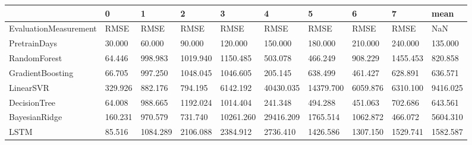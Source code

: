 \begin{tabular}{llllllllll}
\toprule
{} &       0 &        1 &        2 &         3 &         4 &         5 &        6 &        7 &     mean \\
\midrule
EvaluationMeasurement &    RMSE &     RMSE &     RMSE &      RMSE &      RMSE &      RMSE &     RMSE &     RMSE &      NaN \\
PretrainDays          &  30.000 &   60.000 &   90.000 &   120.000 &   150.000 &   180.000 &  210.000 &  240.000 &  135.000 \\
RandomForest          &  64.446 &  998.983 & 1019.940 &  1150.485 &   503.078 &   466.249 &  908.229 & 1455.453 &  820.858 \\
GradientBoosting      &  66.705 &  997.250 & 1048.045 &  1046.605 &   205.145 &   638.499 &  461.427 &  628.891 &  636.571 \\
LinearSVR             & 329.926 &  882.176 &  794.195 &  6142.192 & 40430.035 & 14379.700 & 6059.876 & 6310.100 & 9416.025 \\
DecisionTree          &  64.008 &  988.665 & 1192.024 &  1014.404 &   241.348 &   494.288 &  451.063 &  702.686 &  643.561 \\
BayesianRidge         & 160.231 &  970.579 &  731.740 & 10261.260 & 29416.209 &  1765.514 & 1062.872 &  466.072 & 5604.310 \\
LSTM                  &  85.516 & 1084.289 & 2106.088 &  2384.912 &  2736.410 &  1426.586 & 1307.150 & 1529.741 & 1582.587 \\
\bottomrule
\end{tabular}
